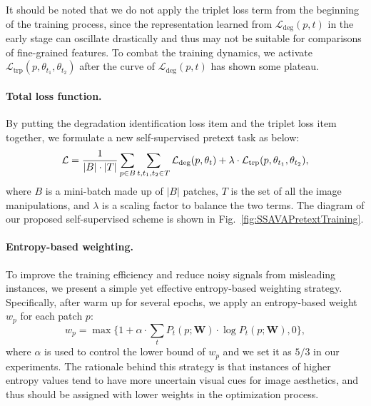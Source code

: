 \documentclass[letterpaper]{article}
\newcommand{\patch}{p}
\newcommand{\transformation}{t}
\newcommand{\params}{\theta} %
\newcommand{\transformations}{T}
\newcommand{\model}{\mathbf{W}}
\newcommand{\loss}{\mathcal{L}}
\newcommand{\degradationloss}{\loss_{\mathrm{deg}}}
\newcommand{\tripletloss}{\loss_{\mathrm{trp}}}
\newcommand{\totalloss}{\loss}
\newcommand{\minibatch}{B}
\begin{document}
It should be noted that we do not apply the triplet loss term from the beginning of the training process, since the representation learned from $\degradationloss(\patch, \transformation)$ in the early stage can oscillate drastically and thus may not be suitable for comparisons of fine-grained features.
To combat the training dynamics, we activate $\tripletloss(\patch, \params_{\transformation_{1}}, \params_{\transformation_{2}})$ after the curve of $\degradationloss(\patch, \transformation)$ has shown some plateau.

\paragraph{Total loss function.}
By putting the degradation identification loss item and the triplet loss item together, we formulate a new self-supervised pretext task as below:
\begin{equation}
    \centering
        \totalloss = \frac{1}{|\minibatch| \cdot |\transformations|} \sum_{\patch \in \minibatch} \sum_{\transformation, \transformation_{1}, \transformation_{2} \in \transformations} \degradationloss(\patch, \params_{t})
          + \lambda \cdot \tripletloss(\patch, \params_{\transformation_{1}}, \params_{\transformation_{2}}),
    \label{equ:SSAVA}
\end{equation}
where $\minibatch$ is a mini-batch made up of $|\minibatch|$ patches, $\transformations$ is the set of all the image manipulations, and $\lambda$ is a scaling factor to balance the two terms.
The diagram of our proposed self-supervised scheme is shown in Fig.~\ref{fig:SSAVAPretextTraining}.

\paragraph{Entropy-based weighting.}
To improve the training efficiency and reduce noisy signals from misleading instances, we present a simple yet effective entropy-based weighting strategy.
Specifically, after warm up for several epochs, we apply an entropy-based weight $w_{p}$ for each patch $p$:
\begin{equation*}
    w_{p} = \max \{1 + \alpha \cdot \sum_{\transformation} P_{\transformation}(\patch; \model) \cdot \log P_{\transformation}(\patch; \model), 0 \},
\end{equation*}
where $\alpha$ is used to control the lower bound of $w_{p}$ and we set it as $5/3$ in our experiments.
The rationale behind this strategy is that instances of higher entropy values tend to have more uncertain visual cues for image aesthetics, and thus should be assigned with lower weights in the optimization process.
\end{document}
